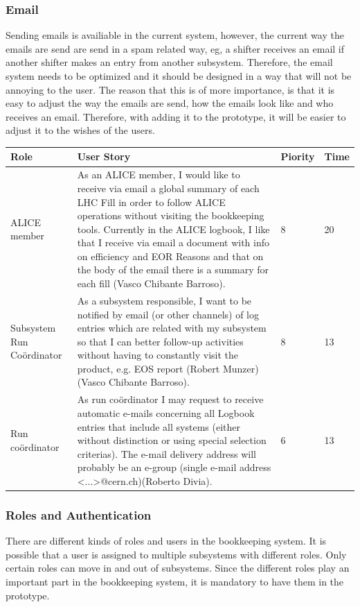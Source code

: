 \documentclass[paper=a4, fontsize=11pt,twoside]{scrartcl}	%
\begin{document}
\subsubsection{Email}
Sending emails is availiable in the current system, however, the current way the emails are send are send in a spam related way, eg, a shifter receives an email if another shifter makes an entry from another subsystem. Therefore, the email system needs to be optimized and it should be designed in a way that will not be annoying to the user. The reason that this is of more importance, is that it is easy to adjust the way the emails are send, how the emails look like and who receives an email. Therefore, with adding it to the prototype, it will be easier to adjust it to the wishes of the users.
\begin{longtable}{ | p{2cm} | p{8cm} | p{1.5cm} | l |}
\hline
Role & User Story & Piority & Time \\ \hline
ALICE member & As an ALICE member, I would like to receive via email a global summary of each LHC Fill in order to follow ALICE operations without visiting the bookkeeping tools. Currently in the ALICE logbook, I like that I receive via email a document with info on efficiency and EOR Reasons and that on the body of the email there is a summary for
each fill (Vasco Chibante Barroso). & 8 & 20 \\ \hline
Subsystem Run Coördinator &  As a subsystem responsible, I want to be notified by email (or other
channels) of log entries which are related with my subsystem so that I can better follow-up activities without having to constantly visit the product, e.g. EOS report (Robert Munzer) (Vasco Chibante Barroso). & 8 & 13 \\ \hline
Run coördinator & As run coördinator I may request to receive automatic e-mails concerning all Logbook entries that include all systems (either without distinction or using special selection criterias). The e-mail delivery address will probably be an e-group (single e-mail address <...>@cern.ch)(Roberto Divia). & 6 & 13 \\ \hline
\end{longtable}

\subsubsection{Roles and Authentication}
There are different kinds of roles and users in the bookkeeping system. It is possible that a user is assigned to multiple subsystems with different roles. Only certain roles can move in and out of subsystems. Since the different roles play an important part in the bookkeeping system, it is mandatory to have them in the prototype.
\end{document}
